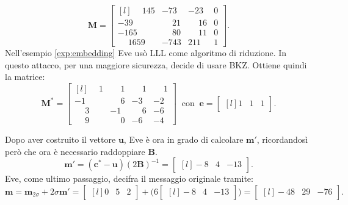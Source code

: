 \begin{exmp}
\begin{equation*}
    \mathbf{M} =
    \begin{bmatrix*}[l]
        \phantom{-}145 & -73 & -23 & 0\\
        -39 & \phantom{-}21 & \phantom{-}16 & 0\\
        -165 & \phantom{-}80 & \phantom{-}11 & 0 \\
        \phantom{-}1659 & -743 & 211 & 1
    \end{bmatrix*}.
\end{equation*}
Nell'esempio \ref{exp:embedding} Eve usò LLL come algoritmo di riduzione. In questo attacco,
per una maggiore sicurezza, decide di usare BKZ. Ottiene quindi la matrice:
\begin{equation*}
    \mathbf{M}^* =
    \begin{bmatrix*}[l]
        \phantom{-}1 & \phantom{-}1 & \phantom{-}1 & \phantom{-}1\\
                  -1 & \phantom{-}6 &           -3 & -2\\
        \phantom{-}3 &           -1 & \phantom{-}6 & -6 \\
        \phantom{-}9 & \phantom{-}0 &           -6 & -4
    \end{bmatrix*}
    \ \text{ con } \
    \mathbf{e} =
    \begin{bmatrix*}[l]
        1 & 1 & 1
    \end{bmatrix*}.
\end{equation*}

Dopo aver costruito il vettore $\mathbf{u}$, Eve è ora in grado di calcolare $\mathbf{m}'$,
ricordandosì però che ora è necessario raddoppiare $\mathbf{B}$. 
\begin{equation*}
    \mathbf{m}' =  (\mathbf{c}^* - \mathbf{u}) (2\mathbf{B})^{-1}=
    \begin{bmatrix*}[l]
        -8 & 4 & -13
    \end{bmatrix*}.
\end{equation*}
Eve, come ultimo passaggio, decifra il messaggio originale tramite:
\[
    \mathbf{m} = \mathbf{m}_{2\sigma} + 2\sigma\mathbf{m}' =
    \begin{bmatrix*}[l]
        0 & 5 & 2
    \end{bmatrix*} + 
    \Biggl(
        6
        \begin{bmatrix*}[l]
            -8 & 4 & -13
        \end{bmatrix*}
    \Biggl)
    =
    \begin{bmatrix*}[l]
        -48 & 29 & -76
    \end{bmatrix*}.
\]
\end{exmp}

